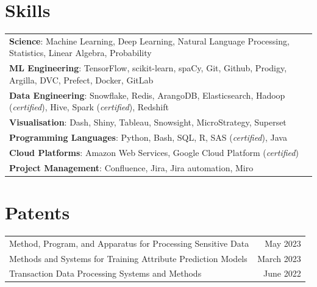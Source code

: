 \documentclass[letterpaper,11pt]{article}
\begin{document}
\section{Skills}
\begin{tabular*}{\textwidth}{l@{\extracolsep{\fill}}r}
 \textbf{\small Science}{\small: Machine Learning, Deep Learning, Natural Language Processing, Statistics, Linear Algebra, Probability}\\
 \textbf{\small ML Engineering}{\small: TensorFlow, scikit-learn, spaCy, Git, Github, Prodigy, Argilla, DVC, Prefect, Docker, GitLab}\\
 \textbf{\small Data Engineering}{\small: Snowflake, Redis, ArangoDB, Elasticsearch, Hadoop (\emph{certified}), Hive, Spark (\emph{certified}), Redshift} \\
 \textbf{\small Visualisation}{\small: Dash, Shiny, Tableau, Snowsight, MicroStrategy, Superset} \\
 \textbf{\small Programming Languages}{\small: Python, Bash, SQL, R, SAS (\emph{certified}), Java} \\
 \textbf{\small Cloud Platforms}{\small: Amazon Web Services, Google Cloud Platform (\emph{certified})}\\
 \textbf{\small Project Management}{\small: Confluence, Jira, Jira automation, Miro}\\
\end{tabular*}

\section{Patents}
\begin{tabular*}{\textwidth}{l@{\extracolsep{\fill}}r}
Method, Program, and Apparatus for Processing Sensitive Data & May 2023\\
Methods and Systems for Training Attribute Prediction Models & March 2023\\
Transaction Data Processing Systems and Methods & June 2022\\
\end{tabular*}

\end{document}
